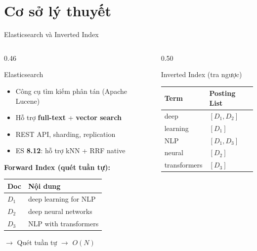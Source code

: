 \section{Cơ sở lý thuyết}

\begin{frame}{Elasticsearch và Inverted Index}
\begin{columns}[T]
\begin{column}{0.46\textwidth}

\begin{block}{Elasticsearch}
{\small
\begin{itemize}\itemsep0pt \parskip0pt 
    \item Công cụ tìm kiếm phân tán (Apache Lucene)
    \item Hỗ trợ \textbf{full-text} + \textbf{vector search}
    \item REST API, sharding, replication
    \item ES \textbf{8.12}: hỗ trợ kNN + RRF native
\end{itemize}
}
\end{block}

\vspace{0.1cm}

{\small\textbf{Forward Index (quét tuần tự):}}

{\scriptsize
\begin{tabular}{l|l}
\textcolor{accentTeal}{\textbf{Doc}} & \textcolor{accentTeal}{\textbf{Nội dung}} \\
\hline
$D_1$ & deep learning for NLP \\
$D_2$ & deep neural networks \\
$D_3$ & NLP with transformers \\
\end{tabular}

\textcolor{textLight}{$\to$ Quét tuần tự $\to$ $O(N)$}
}

\end{column}
\begin{column}{0.50\textwidth}

\begin{exampleblock}{Inverted Index (tra ngược)}
\centering
{\small
\begin{tabular}{l|l}
\textcolor{accentTeal}{\textbf{Term}} & \textcolor{accentTeal}{\textbf{Posting List}} \\
\hline
deep & $[D_1, D_2]$ \\
learning & $[D_1]$ \\
NLP & $[D_1, D_3]$ \\
neural & $[D_2]$ \\
transformers & $[D_3]$ \\
\end{tabular}
}


\end{exampleblock}
\end{column}
\end{columns}
\end{frame}
